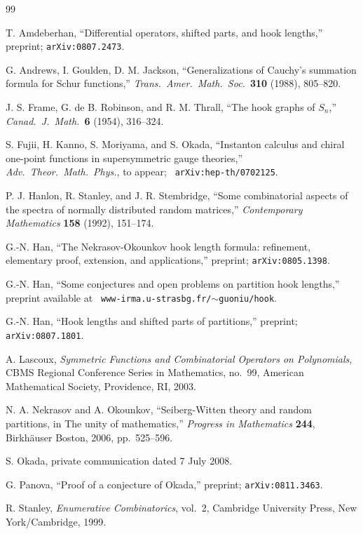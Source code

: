 \documentclass[12pt]{article}
\theoremstyle{definition}
\theoremstyle{remark}
\begin{document}
\begin{thebibliography}{99}

 T. Amdeberhan, ``Differential operators, shifted parts,
  and hook lengths,'' preprint; {\tt arXiv:0807.2473}.

 G. Andrews, I. Goulden, D. M. Jackson, ``Generalizations
  of Cauchy's summation formula for Schur functions,'' \emph{Trans.\
    Amer.\ Math.\ Soc.}\ \textbf{310} (1988), 805--820.

 J. S. Frame, G. de B. Robinson, and R. M. Thrall, ``The
  hook graphs of $S_n$,'' \emph{Canad.\ J.\ Math.}\ \textbf{6} (1954),
  316--324. 

  S. Fujii, H. Kanno, S. Moriyama, and S. Okada,
     ``Instanton calculus and chiral one-point functions 
     in supersymmetric gauge theories,''
     \emph{Adv.\ Theor.\ Math.\ Phys.}, to appear; {\tt
       arXiv:hep-th/0702125}. 

 P. J. Hanlon, R. Stanley, and J. R. Stembridge, ``Some
  combinatorial aspects of the spectra of normally distributed random
  matrices,'' \emph{Contemporary Mathematics} \textbf{158} (1992),
  151--174.

 G.-N. Han, ``The Nekrasov-Okounkov hook length formula:
  refinement, elementary proof, extension, and applications,'' preprint;
  {\tt arXiv:0805.1398}.

 G.-N. Han, ``Some conjectures and open problems on
  partition hook lengths,'' preprint available at {\tt
    www-irma.u-strasbg.fr/$\sim$guoniu/hook}. 

 G.-N. Han, ``Hook lengths and shifted parts of
  partitions,'' preprint; {\tt arXiv:0807.1801}.

 A. Lascoux, \emph{Symmetric Functions and
    Combinatorial Operators on Polynomials}, CBMS Regional Conference
  Series in Mathematics, no.~99, American Mathematical Society,
  Providence, RI, 2003.

 N. A. Nekrasov and A. Okounkov, ``Seiberg-Witten theory
  and random partitions, in The unity of mathematics,'' \emph{Progress
    in Mathematics} \textbf{244}, Birkh\"auser Boston, 2006,
  pp.~525--596. 

 S. Okada, private communication dated 7 July 2008.

 G. Panova, ``Proof of a conjecture of Okada,''
  preprint; {\tt arXiv:0811.3463}.

 R. Stanley, \emph{Enumerative Combinatorics}, vol.~2,
  Cambridge University Press, New York/Cam\-bridge, 1999.


\end{thebibliography}
\end{document}
